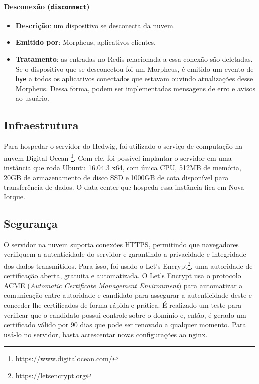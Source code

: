 \paragraph{Desconexão (\texttt{disconnect})}
\begin{itemize}
\item \textbf{Descrição}: um dispositivo se desconecta da nuvem.
\item \textbf{Emitido por}: Morpheus, aplicativos clientes.
\item \textbf{Tratamento}: as entradas no Redis relacionada a essa conexão são deletadas. Se o dispositivo que se desconectou foi um Morpheus, é emitido um evento de \texttt{bye} a todos os aplicativos conectados que estavam ouvindo atualizações desse Morpheus. Dessa forma, podem ser implementadas mensagens de erro e avisos ao usuário.
\end{itemize}

\subsection{Infraestrutura}

Para hospedar o servidor do Hedwig, foi utilizado o serviço de computação na nuvem Digital Ocean \footnote{https://www.digitalocean.com/}. Com ele, foi possível implantar o servidor em uma instância que roda Ubuntu 16.04.3 x64, com única CPU, 512MB de memória, 20GB de armazenamento de disco SSD e 1000GB de cota disponível para transferência de dados. O data center que hospeda essa instância fica em Nova Iorque.

\subsection{Segurança}

O servidor na nuvem suporta conexões HTTPS, permitindo que navegadores verifiquem a autenticidade do servidor e garantindo a privacidade e integridade dos dados transmitidos. Para isso, foi usado o Let's Encrypt\footnote{https://letsencrypt.org}, uma autoridade de certificação aberta, gratuita e automatizada. O Let's Encrypt usa o protocolo ACME (\emph{Automatic Certificate Management Environment}) para automatizar a comunicação entre autoridade e candidato para assegurar a autenticidade deste e conceder-lhe certificados de forma rápida e prática. É realizado um teste para verificar que o candidato possui controle sobre o domínio e, então, é gerado um certificado válido por 90 dias que pode ser renovado a qualquer momento. Para usá-lo no servidor, basta acrescentar novas configurações ao nginx.

